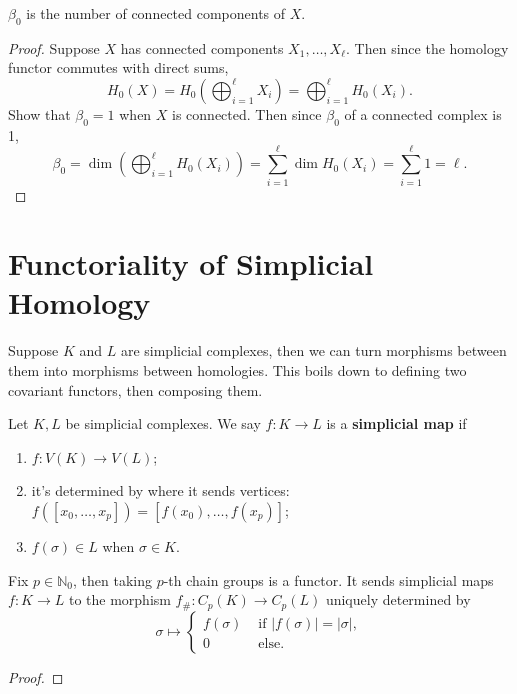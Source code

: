 \documentclass[twoside,10pt]{report}
\begin{document}
\begin{prop}
	$\beta_0$ is the number of connected components of $X$. 
\end{prop}
\begin{proof}
	Suppose $X$ has connected components $X_1, \dots, X_{\ell}$. Then since the homology functor commutes with direct sums,
	\[
		H_{0}(X) = H_{0}\left( \bigoplus_{i=1}^{\ell}X_{i} \right) = \bigoplus_{i=1}^{\ell}H_{0}(X_{i}).
	\] 
	{\color{blue}Show that $\beta_0=1$ when $X$ is connected.}
	Then since $\beta_0$ of a connected complex is 1,
	\[
		\beta_0 = \dim \left( \bigoplus_{i=1}^{\ell}H_{0}(X_i) \right) = \sum_{i=1}^{\ell} \dim H_0(X_{i}) = \sum_{i=1}^{\ell}1 = \ell.
	\] 
\end{proof}


\section{Functoriality of Simplicial Homology}


Suppose $K$ and $L$ are simplicial complexes, then we can turn morphisms between them into morphisms between homologies. This boils down to defining two covariant functors, then composing them.

\begin{defn}[]
Let $K,L$ be simplicial complexes. We say $f:K\to L$ is a \textbf{simplicial map} if
\begin{enumerate}
	\item $f:V(K)\to V(L)$;
	\item it's determined by where it sends vertices: $f([x_0, \dots, x_p]) = [f(x_0), \dots, f(x_{p})]$;
	\item $f(\sigma) \in L$ when $\sigma \in K$.
\end{enumerate}
\end{defn}

\begin{thrm}[]
	Fix $p \in \mathbb{N}_{0}$, then taking $p$-th chain groups is a functor. It sends simplicial maps $f:K\to L$ to the morphism $f_{\#}:C_{p}(K)\to C_{p}(L)$ uniquely determined by
	\[
		\sigma \mapsto 
		\begin{cases}
			f(\sigma) & \text{ if } |f(\sigma)|=|\sigma|, \\
			0 & \text{ else}.
		\end{cases}
\]
\end{thrm}
\begin{proof}
\end{proof}
\end{document}
